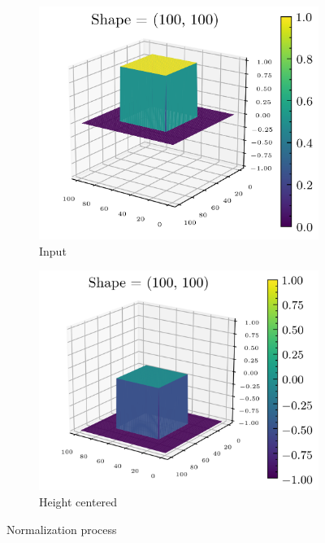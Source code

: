 \documentclass[../document.tex]{subfiles}
\begin{document}
\begin{figure}[H]
              \begin{subfigure}[b]{0.5\textwidth}
            \includegraphics[width=\textwidth]{../img/data-aug/3d/square-middle.png}
            \caption{Input}
        \end{subfigure}
        \begin{subfigure}[b]{0.5\textwidth}
            \includegraphics[width=\textwidth]{../img/data-aug/3d/square-middle-center.png}
            \caption{Height centered}
        \end{subfigure}  
    \label{fig: center}
    \caption{Normalization process}    
\end{figure}
\end{document}
